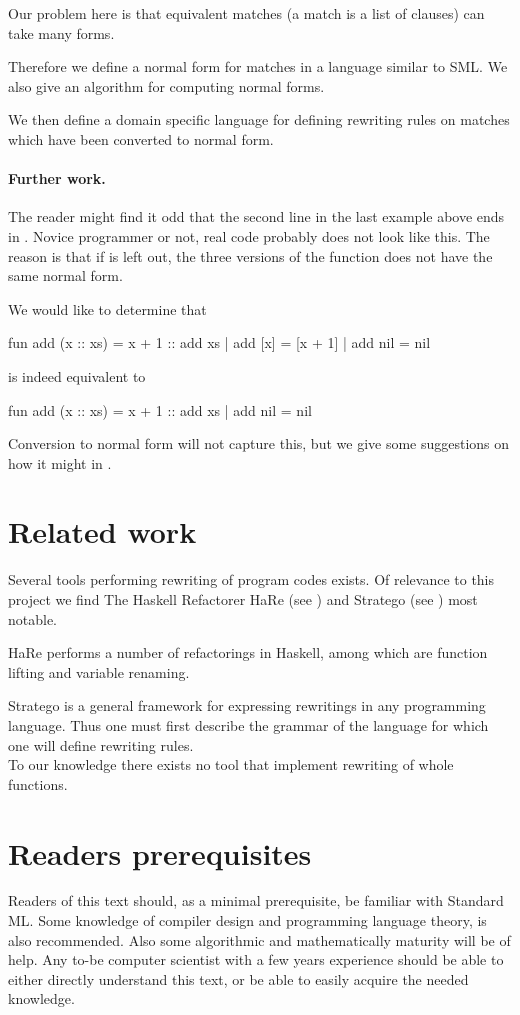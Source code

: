 Our problem here is that equivalent matches (a match is a list of clauses) can
take many forms.

Therefore we define a normal form for matches in a language similar to SML. We
also give an algorithm for computing normal forms.

We then define a domain specific language for defining rewriting rules on
matches which have been converted to normal form.

\paragraph{Further work.}
The reader might find it odd that the second line in the last example above ends
in . Novice programmer or not, real code probably does not
look like this. The reason is that if  is left out, the three
versions of the function  does not have the same normal form.

We would like to determine that
\begin{sml}
fun add (x :: xs) = x + 1 :: add xs
  | add [x]       = [x + 1]
  | add nil       = nil
\end{sml}
is indeed equivalent to
\begin{sml}
fun add (x :: xs) = x + 1 :: add xs
  | add nil       = nil
\end{sml}
Conversion to normal form will not capture this, but we give some suggestions on
how it might in .

\section{Related work}
Several tools performing rewriting of program codes exists. Of relevance to this
project we find The Haskell Refactorer HaRe (see \cite{HARE}) and Stratego (see
\cite{stratego}) most notable.

HaRe performs a number of refactorings in Haskell, among which are function
lifting and variable renaming.

Stratego is a general framework for expressing rewritings in any programming
language. Thus one must first describe the grammar of the language for which one
will define rewriting rules.\\

To our knowledge there exists no tool that implement rewriting of whole
functions.

\section{Readers prerequisites}
Readers of this text should, as a minimal prerequisite, be familiar with
Standard ML. Some knowledge of compiler design and programming language theory,
is also recommended. Also some algorithmic and mathematically maturity will be
of help. Any to-be computer scientist with a few years experience should be able
to either directly understand this text, or be able to easily acquire the needed
knowledge.\\

